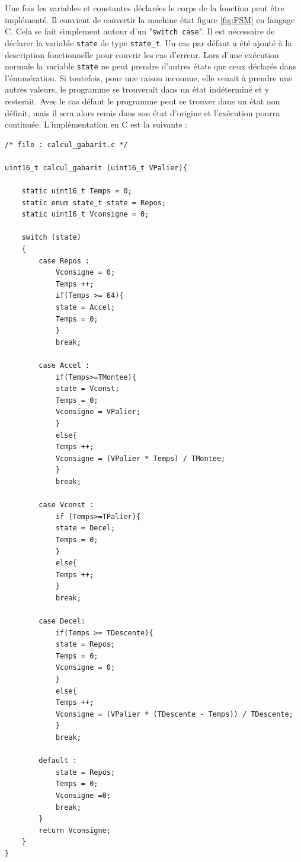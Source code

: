 \documentclass[a4paper]{article}
\begin{document}
	Une fois les variables et constantes déclarées le corps de la fonction peut être implémenté. Il convient de convertir la machine état figure \ref{fig:FSM} en langage C. Cela se fait simplement autour d'un "\texttt{switch case}". Il est nécessaire de déclarer la variable \texttt{state} de type \texttt{state\_t}. Un cas par défaut a été ajouté à la description fonctionnelle pour couvrir les cas d'erreur. Lors d'une exécution normale la variable \texttt{state} ne peut prendre d'autres états que ceux déclarés dans l'énumération. Si toutefois, pour une raison inconnue, elle venait à prendre une autres valeurs, le programme se trouverait dans un état indéterminé et y resterait. Avec le cas défaut le programme peut se trouver dans un état non définit, mais il sera alors remis dans son état d'origine et l'exécution pourra continuée. L'implémentation en C est la suivante :
	
	
	\newpage

	
	\begin{lstlisting}[style=CStyle]
/* file : calcul_gabarit.c */

uint16_t calcul_gabarit (uint16_t VPalier){

	static uint16_t Temps = 0;
	static enum state_t state = Repos;
	static uint16_t Vconsigne = 0;
	
	switch (state)
	{
		case Repos :
			Vconsigne = 0;
			Temps ++;
			if(Temps >= 64){
			state = Accel;
			Temps = 0;
			}
			break;
	
		case Accel :
			if(Temps>=TMontee){
			state = Vconst;
			Temps = 0;
			Vconsigne = VPalier;
			}
			else{
			Temps ++;
			Vconsigne = (VPalier * Temps) / TMontee;
			}
			break;
	
		case Vconst :
			if (Temps>=TPalier){
			state = Decel;
			Temps = 0;
			}
			else{
			Temps ++;
			}
			break;
	
		case Decel:
			if(Temps >= TDescente){
			state = Repos;
			Temps = 0;
			Vconsigne = 0;
			}
			else{
			Temps ++;
			Vconsigne = (VPalier * (TDescente - Temps)) / TDescente;
			}
			break;
			
		default :
			state = Repos;
			Temps = 0;
			Vconsigne =0;
			break;
		}
		return Vconsigne;
	}
}	\end{lstlisting}

	\newpage
\end{document}
